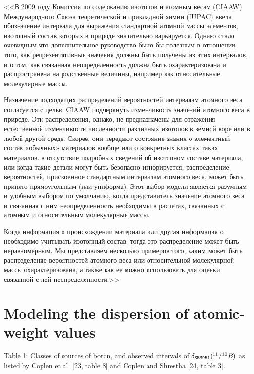 \documentclass[a5paper,openany]{book}
\begin{document}
<<В 2009 году Комиссия по содержанию изотопов и атомным весам (CIAAW) Международного
Союза теоретической и прикладной химии (IUPAC) ввела обозначение интервала для выражения стандартной атомной
массы элементов, изотопный состав которых в природе значительно варьируется. Однако стало очевидным
что дополнительное руководство было бы полезным в отношении того, как репрезентативные значения должны быть получены из этих интервалов,
и о том, как связанная неопределенность должна быть охарактеризована и распространена на родственные величины, например
как относительные молекулярные массы. 

Назначение подходящих распределений вероятностей интервалам атомного веса
согласуется с целью CIAAW подчеркнуть изменчивость значений атомного веса в природе.
Эти распределения, однако, не предназначены для отражения естественной изменчивости численности различных
изотопов в земной коре или в любой другой среде. Скорее, они передают состояние знания о
элементный состав «обычных» материалов вообще или о конкретных классах таких материалов. в
отсутствие подробных сведений об изотопном составе материала, или когда такие детали могут быть безопасно
игнорируется, распределение вероятностей, присвоенное стандартным интервалам атомного веса, может быть принято прямоугольным
(или униформа). Этот выбор модели является разумным и удобным выбором по умолчанию, когда представитель
значение атомного веса и связанная с ним неопределенность необходимы в расчетах, связанных с атомным и относительным
молекулярные массы. 

Когда информация о происхождении материала или другая информация о
необходимо учитывать изотопный состав, тогда это распределение может быть неравномерным. Мы представляем
несколько примеров того, каким может быть распределение вероятностей атомного веса или относительной молекулярной массы охарактеризована, а также как ее можно использовать для оценки связанной с ней неопределенности.>>

\section{Modeling the dispersion of atomic-weight values}

Table 1: Classes of sources of boron, and observed intervals of $\delta_{\tt SRM951}(^{11}/^{10}B)$ as listed by Coplen et al. [23, table 8] and Coplen and Shrestha [24, table 3].
\end{document}
